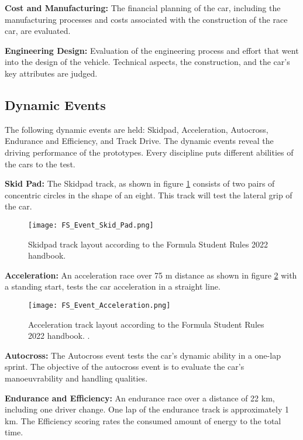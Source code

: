 \textbf{Cost and Manufacturing:} The financial planning of the car, including the manufacturing processes and costs associated with the construction of the race car, are evaluated.

\textbf{Engineering Design:} Evaluation of the engineering process and effort that went into the design of the vehicle. Technical aspects, the construction, and the car's key attributes are judged.

\subsection{Dynamic Events} \label{sec:Dynamic Events}
The following dynamic events are held: Skidpad, Acceleration, Autocross, Endurance and Efficiency, and Track Drive.
The dynamic events reveal the driving performance of the prototypes. Every discipline puts different abilities of the cars to the test. \cite{fs_rules_2022_handbook}

\pagebreak

\textbf{Skid Pad:} The Skidpad track, as shown in figure \ref{fig:FS Skidpad layout} consists of two pairs of concentric circles in the shape of an eight. This track will test the lateral grip of the car.
\begin{figure}[H]
    \centering
    \texttt{[image: FS\_Event\_Skid\_Pad.png]}
    \caption{Skidpad track layout according to the Formula Student Rules 2022 handbook. \cite{fs_rules_2022_handbook}}
    \label{fig:FS Skidpad layout}
\end{figure}

\pagebreak

\textbf{Acceleration:} An acceleration race over 75 m distance as shown in figure \ref{fig:FS Acceleration layout} with a standing start, tests the car acceleration in a straight line.
\begin{figure}[H]
    \centering
    \texttt{[image: FS\_Event\_Acceleration.png]}
    \caption{Acceleration track layout according to the Formula Student Rules 2022 handbook. \cite{fs_rules_2022_handbook}.}
    \label{fig:FS Acceleration layout}
\end{figure}

\textbf{Autocross:} The Autocross event tests the car's dynamic ability in a one-lap sprint. The objective of the autocross event is to evaluate the car's manoeuvrability and handling qualities.

\textbf{Endurance and Efficiency:} An endurance race over a distance of 22 km, including one driver change. One lap of the endurance track is approximately 1 km. The Efficiency scoring rates the consumed amount of energy to the total time.


